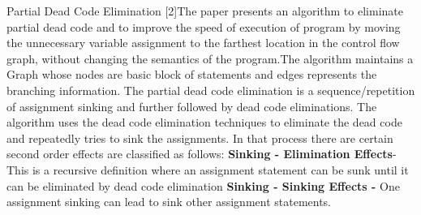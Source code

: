 \documentclass[conference]{IEEEtran}
\begin{document}
Partial Dead Code Elimination [2]The paper presents an algorithm to eliminate partial dead code and to improve the speed of execution of program by moving the unnecessary variable assignment to the farthest location in the control flow graph, without changing the semantics of the program.The algorithm maintains a Graph whose nodes are basic block of statements and edges represents the branching information. The partial dead code elimination is a sequence/repetition of assignment sinking and further followed by dead code eliminations. The algorithm uses the dead code elimination techniques to eliminate the dead code and repeatedly tries to sink the assignments. In that process there are certain second order effects are classified as follows:
\textbf{Sinking - Elimination Effects}- This is a recursive definition where an assignment statement can be sunk until it can be eliminated by dead code elimination
\textbf{Sinking - Sinking Effects -} One assignment sinking can lead to sink other assignment statements.
\end{document}
